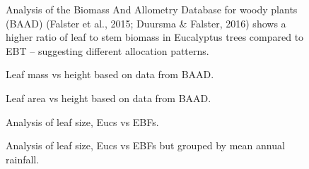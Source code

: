 \documentclass[12pt,a4paper,oneside]{article}
\begin{document}
\begin{figure}[!hbtp]
\centering
{}
\caption{\small{Analysis of the Biomass And Allometry Database for woody plants (BAAD) (Falster et al., 2015; Duursma \& Falster, 2016) shows a higher ratio of leaf to stem biomass in Eucalyptus trees compared to EBT -- suggesting different allocation patterns.}}
\label{}
\end{figure}

\FloatBarrier

\begin{figure}[!hbtp]
\centering
{}
\caption{\small{Leaf mass vs height based on data from BAAD.}}
\label{}
\end{figure}

\FloatBarrier

\begin{figure}[!hbtp]
\centering
{}
\caption{\small{Leaf area vs height based on data from BAAD.}}
\label{}
\end{figure}



\FloatBarrier

\begin{figure}[!hbtp]
\centering
{}
\caption{\small{Analysis of leaf size, Eucs vs EBFs.}}
\label{}
\end{figure}

\FloatBarrier

\begin{figure}[!hbtp]
\centering
{}
\caption{\small{Analysis of leaf size, Eucs vs EBFs but grouped by mean annual rainfall.}}
\label{}
\end{figure}
\end{document}
